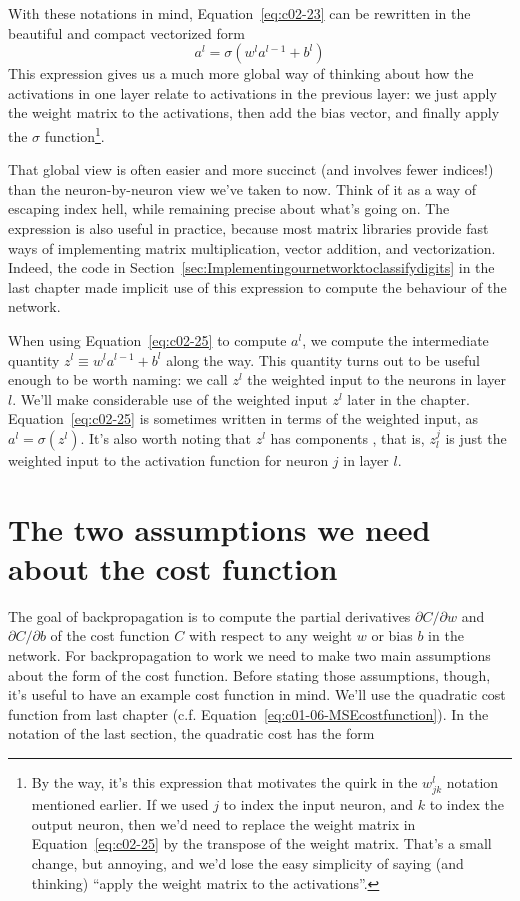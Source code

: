 With these notations in mind, Equation~\ref{eq:c02-23} can be rewritten in the beautiful and compact vectorized form 
\begin{equation}
a^{l}=\sigma\left(w^{l} a^{l-1}+b^{l}\right)
\label{eq:c02-25}
\end{equation}
This expression gives us a much more global way of thinking about how the activations in one layer relate to activations in the previous layer: we just apply the weight matrix to the activations, then add the bias vector, and finally apply the $\sigma$ function\footnote{By the way, it's this expression that motivates the quirk in the $w^l_{jk}$ notation mentioned earlier. If we used $j$ to index the input neuron, and $k$ to index the output neuron, then we'd need to replace the weight matrix in Equation~\ref{eq:c02-25} by the transpose of the weight matrix. That's a small change, but annoying, and we'd lose the easy simplicity of saying (and thinking) ``apply the weight matrix to the activations''.}.

That global view is often easier and more succinct (and involves fewer indices!) than the neuron-by-neuron view we've taken to now. Think of it as a way of escaping index hell, while remaining precise about what's going on. The expression is also useful in practice, because most matrix libraries provide fast ways of implementing matrix multiplication, vector addition, and vectorization. Indeed, the code in Section~\ref{sec:Implementingournetworktoclassifydigits} in the last chapter made implicit use of this expression to compute the behaviour of the network.

When using Equation~\ref{eq:c02-25} to compute $a^l$, we compute the intermediate quantity $z^{l} \equiv w^{l} a^{l-1}+b^{l}$ along the way. This quantity turns out to be useful enough to be worth naming: we call $z^l$ the weighted input to the neurons in layer $l$. We'll make considerable use of the weighted input $z^l$ later in the chapter. Equation~\ref{eq:c02-25} is sometimes written in terms of the weighted input, as $a^{l}=\sigma\left(z^{l}\right)$. It's also worth noting that $z^l$ has components , that is, $z_l^j$ is just the weighted input to the activation function for neuron $j$ in layer $l$.

\section{The two assumptions we need about the cost function}

The goal of backpropagation is to compute the partial derivatives $\partial C / \partial w$ and $\partial C / \partial b$ of the cost function $C$ with respect to any weight $w$ or bias $b$ in the network. For backpropagation to work we need to make two main assumptions about the form of the cost function. Before stating those assumptions, though, it's useful to have an example cost function in mind. We'll use the quadratic cost function from last chapter (c.f. Equation~\ref{eq:c01-06-MSEcostfunction}). In the notation of the last section, the quadratic cost has the form 


